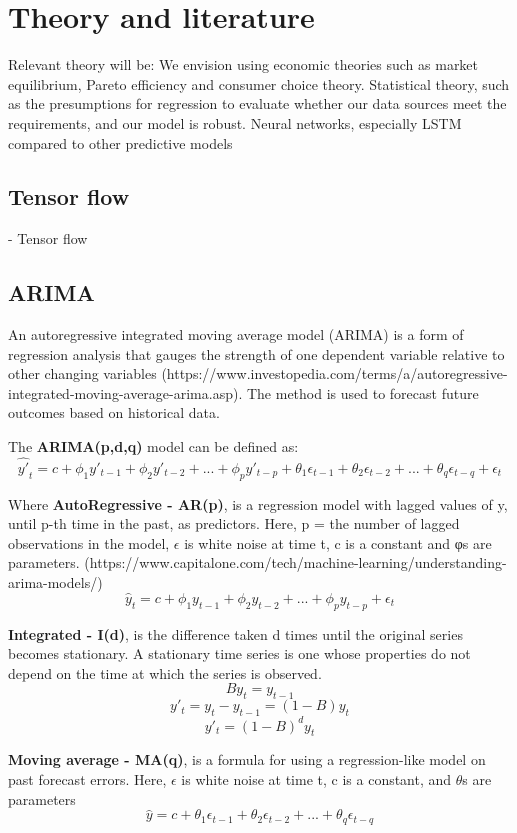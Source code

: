 \section{Theory and literature}

Relevant theory will be: 
We envision using economic theories such as market equilibrium, Pareto efficiency and consumer choice theory. 
Statistical theory, such as the presumptions for regression to evaluate whether our data sources meet the requirements, and our model is robust. 
Neural networks, especially LSTM compared to other predictive models 

\subsection{Tensor flow}
- Tensor flow \\

\subsection{ARIMA}
An autoregressive integrated moving average model (ARIMA) is a form of regression analysis that gauges the strength of one dependent variable relative to other changing variables (https://www.investopedia.com/terms/a/autoregressive-integrated-moving-average-arima.asp). The method is used to forecast future outcomes based on historical data. 

The \textbf{ARIMA(p,d,q)} model can be defined as: 
$$\hat{y'}_t = c + \phi_1y'_{t-1} + \phi_2y'_{t-2} + ... + \phi_py'_{t-p} + \theta_1\epsilon_{t-1} + \theta_2\epsilon_{t-2} + ... + \theta_q\epsilon_{t-q} + \epsilon_t$$

Where \textbf{AutoRegressive - AR(p)}, is a regression model with lagged values of y, until p-th time in the past, as predictors. Here, p = the number of lagged observations in the model, $\epsilon$ is white noise at time t, c is a constant and φs are parameters. (https://www.capitalone.com/tech/machine-learning/understanding-arima-models/) 
$$\hat{y}_t = c + \phi_1y_{t-1} + \phi_2y_{t-2} + ... + \phi_py_{t-p} 
+ \epsilon_t$$

\textbf{Integrated - I(d)}, is the difference taken d times until the original series becomes stationary. A stationary time series is one whose properties do not depend on the time at which the series is observed.
$$By_t = y_{t-1}$$ 
$$y'_t = y_t - y_{t-1} = (1 - B)y_t$$
$$y'_t = (1-B)^dy_t$$

\textbf{Moving average - MA(q)}, is a formula for using a regression-like model on past forecast errors. Here, $\epsilon$ is white noise at time t, c is a constant, and $\theta$s are parameters
$$\hat{y} = c + \theta_1\epsilon_{t-1} + \theta_2\epsilon_{t-2} + ... + \theta_q\epsilon_{t-q}$$

